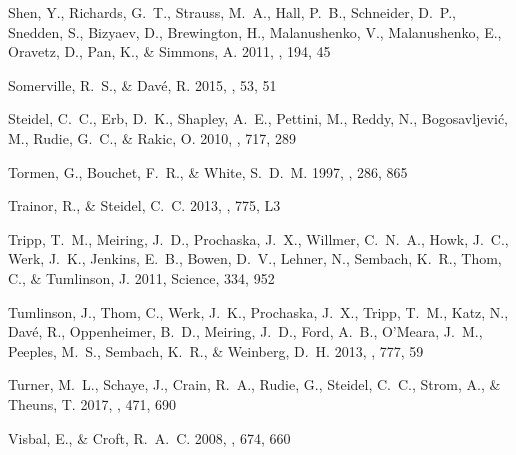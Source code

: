 \documentclass[iop]{emulateapj}
\begin{document}
\begin{thebibliography}{61}
{Shen}, Y., {Richards}, G.~T., {Strauss}, M.~A., {Hall}, P.~B., {Schneider},
  D.~P., {Snedden}, S., {Bizyaev}, D., {Brewington}, H., {Malanushenko}, V.,
  {Malanushenko}, E., {Oravetz}, D., {Pan}, K., \& {Simmons}, A. 2011, \apjs,
  194, 45

{Somerville}, R.~S., \& {Dav{\'e}}, R. 2015, \araa, 53, 51

{Steidel}, C.~C., {Erb}, D.~K., {Shapley}, A.~E., {Pettini}, M., {Reddy}, N.,
  {Bogosavljevi{\'c}}, M., {Rudie}, G.~C., \& {Rakic}, O. 2010, \apj, 717, 289

{Tormen}, G., {Bouchet}, F.~R., \& {White}, S.~D.~M. 1997, \mnras, 286, 865

{Trainor}, R., \& {Steidel}, C.~C. 2013, \apjl, 775, L3

{Tripp}, T.~M., {Meiring}, J.~D., {Prochaska}, J.~X., {Willmer}, C.~N.~A.,
  {Howk}, J.~C., {Werk}, J.~K., {Jenkins}, E.~B., {Bowen}, D.~V., {Lehner}, N.,
  {Sembach}, K.~R., {Thom}, C., \& {Tumlinson}, J. 2011, Science, 334, 952

{Tumlinson}, J., {Thom}, C., {Werk}, J.~K., {Prochaska}, J.~X., {Tripp}, T.~M.,
  {Katz}, N., {Dav{\'e}}, R., {Oppenheimer}, B.~D., {Meiring}, J.~D., {Ford},
  A.~B., {O'Meara}, J.~M., {Peeples}, M.~S., {Sembach}, K.~R., \& {Weinberg},
  D.~H. 2013, \apj, 777, 59

{Turner}, M.~L., {Schaye}, J., {Crain}, R.~A., {Rudie}, G., {Steidel}, C.~C.,
  {Strom}, A., \& {Theuns}, T. 2017, \mnras, 471, 690

{Visbal}, E., \& {Croft}, R.~A.~C. 2008, \apj, 674, 660


\end{thebibliography}
\end{document}
